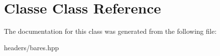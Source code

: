 \hypertarget{classClasse}{}\section{Classe Class Reference}
\label{classClasse}


The documentation for this class was generated from the following file\+:\begin{DoxyCompactItemize}
\item 
headers/bares.\+hpp\end{DoxyCompactItemize}
